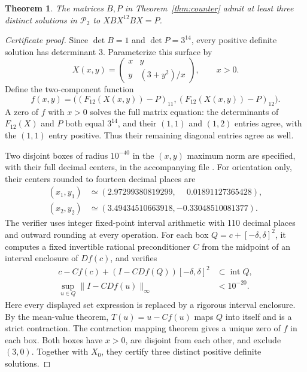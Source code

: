 \documentclass[11pt]{article}
\newtheorem{theorem}{Theorem}
\newcommand{\SPD}{\mathcal P_2}
\begin{document}
\begin{theorem}\label{thm:three}
The matrices $B,P$ in Theorem~\ref{thm:counter} admit at least three distinct solutions in $\SPD$ to $XBX^{12}BX=P$.
\end{theorem}
\begin{proof}[Certificate proof]
Since $\det B=1$ and $\det P=3^{14}$, every positive definite solution has determinant $3$. Parameterize this surface by
\[
X(x,y)=\begin{pmatrix}x&y\\y&(3+y^2)/x\end{pmatrix},\qquad x>0.
\]
Define the two-component function
\[
f(x,y)=\bigl((F_{12}(X(x,y))-P)_{11},
                 (F_{12}(X(x,y))-P)_{12}\bigr).
\]
A zero of $f$ with $x>0$ solves the full matrix equation: the determinants of $F_{12}(X)$ and $P$ both equal $3^{14}$, and their $(1,1)$ and $(1,2)$ entries agree, with the $(1,1)$ entry positive. Thus their remaining diagonal entries agree as well.

Two disjoint boxes of radius $10^{-40}$ in the $(x,y)$ maximum norm are specified, with their full decimal centers, in the accompanying file . For orientation only, their centers rounded to fourteen decimal places are
\[
\begin{split}
(x_1,y_1)&\simeq(2.97299380819299,\phantom{-}0.01891127365428),\\
(x_2,y_2)&\simeq(3.49434510663918,-0.33048510081377).
\end{split}
\]
The verifier uses integer fixed-point interval arithmetic with 110 decimal places and outward rounding at every operation. For each box $Q=c+[-\delta,\delta]^2$, it computes a fixed invertible rational preconditioner $C$ from the midpoint of an interval enclosure of $Df(c)$, and verifies
\begin{align*}
c-Cf(c)+(I-CDf(Q))[-\delta,\delta]^2&\subset\operatorname{int}Q,\\
\sup_{u\in Q}\|I-CDf(u)\|_\infty&<10^{-20}.
\end{align*}
Here every displayed set expression is replaced by a rigorous interval enclosure. By the mean-value theorem, $T(u)=u-Cf(u)$ maps $Q$ into itself and is a strict contraction. The contraction mapping theorem gives a unique zero of $f$ in each box. Both boxes have $x>0$, are disjoint from each other, and exclude $(3,0)$. Together with $X_0$, they certify three distinct positive definite solutions.
\end{proof}
\end{document}

